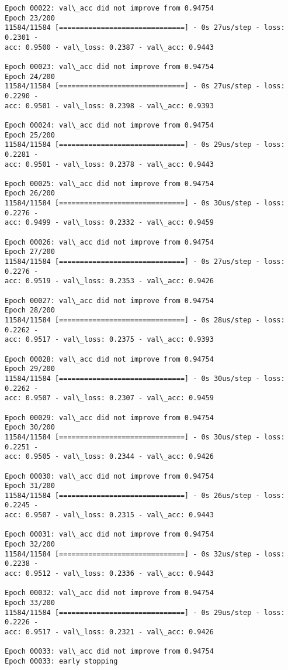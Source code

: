 \documentclass[11pt]{article}
\begin{document}
\begin{Verbatim}[commandchars=\\\{\}]
Epoch 00022: val\_acc did not improve from 0.94754
Epoch 23/200
11584/11584 [==============================] - 0s 27us/step - loss: 0.2301 -
acc: 0.9500 - val\_loss: 0.2387 - val\_acc: 0.9443

Epoch 00023: val\_acc did not improve from 0.94754
Epoch 24/200
11584/11584 [==============================] - 0s 27us/step - loss: 0.2290 -
acc: 0.9501 - val\_loss: 0.2398 - val\_acc: 0.9393

Epoch 00024: val\_acc did not improve from 0.94754
Epoch 25/200
11584/11584 [==============================] - 0s 29us/step - loss: 0.2281 -
acc: 0.9501 - val\_loss: 0.2378 - val\_acc: 0.9443

Epoch 00025: val\_acc did not improve from 0.94754
Epoch 26/200
11584/11584 [==============================] - 0s 30us/step - loss: 0.2276 -
acc: 0.9499 - val\_loss: 0.2332 - val\_acc: 0.9459

Epoch 00026: val\_acc did not improve from 0.94754
Epoch 27/200
11584/11584 [==============================] - 0s 27us/step - loss: 0.2276 -
acc: 0.9519 - val\_loss: 0.2353 - val\_acc: 0.9426

Epoch 00027: val\_acc did not improve from 0.94754
Epoch 28/200
11584/11584 [==============================] - 0s 28us/step - loss: 0.2262 -
acc: 0.9517 - val\_loss: 0.2375 - val\_acc: 0.9393

Epoch 00028: val\_acc did not improve from 0.94754
Epoch 29/200
11584/11584 [==============================] - 0s 30us/step - loss: 0.2262 -
acc: 0.9507 - val\_loss: 0.2307 - val\_acc: 0.9459

Epoch 00029: val\_acc did not improve from 0.94754
Epoch 30/200
11584/11584 [==============================] - 0s 30us/step - loss: 0.2251 -
acc: 0.9505 - val\_loss: 0.2344 - val\_acc: 0.9426

Epoch 00030: val\_acc did not improve from 0.94754
Epoch 31/200
11584/11584 [==============================] - 0s 26us/step - loss: 0.2245 -
acc: 0.9507 - val\_loss: 0.2315 - val\_acc: 0.9443

Epoch 00031: val\_acc did not improve from 0.94754
Epoch 32/200
11584/11584 [==============================] - 0s 32us/step - loss: 0.2238 -
acc: 0.9512 - val\_loss: 0.2336 - val\_acc: 0.9443

Epoch 00032: val\_acc did not improve from 0.94754
Epoch 33/200
11584/11584 [==============================] - 0s 29us/step - loss: 0.2226 -
acc: 0.9517 - val\_loss: 0.2321 - val\_acc: 0.9426

Epoch 00033: val\_acc did not improve from 0.94754
Epoch 00033: early stopping
    \end{Verbatim}
\end{document}
